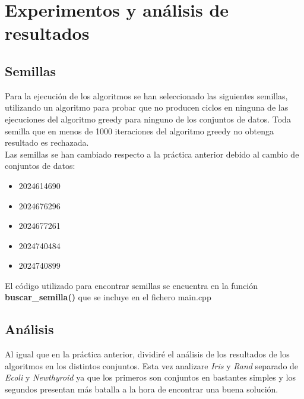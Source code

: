 \chapter{Experimentos y análisis de resultados}
\section{Semillas}
Para la ejecución de los algoritmos se han seleccionado las siguientes semillas, utilizando un algoritmo para probar que no producen ciclos en ninguna de las ejecuciones del algoritmo greedy para ninguno de los conjuntos de datos. Toda semilla que en menos de 1000 iteraciones del algoritmo greedy no obtenga resultado es rechazada. \\
Las semillas se han cambiado respecto a la práctica anterior debido al cambio de conjuntos de datos:
\begin{itemize}
   \item 2024614690
   \item 2024676296
   \item 2024677261
   \item 2024740484
   \item 2024740899
\end{itemize}


El código utilizado para encontrar semillas se encuentra en la función \textbf{buscar\_semilla()} que se incluye en el fichero main.cpp


\section{Análisis}
Al igual que en la práctica anterior, dividiré el análisis de los resultados de los algoritmos en los distintos conjuntos. Esta vez analizare \emph{Iris} y \emph{Rand} separado de \emph{Ecoli} y \emph{Newthyroid} ya que los primeros son conjuntos en bastantes simples y los segundos presentan más batalla a la hora de encontrar una buena solución.

